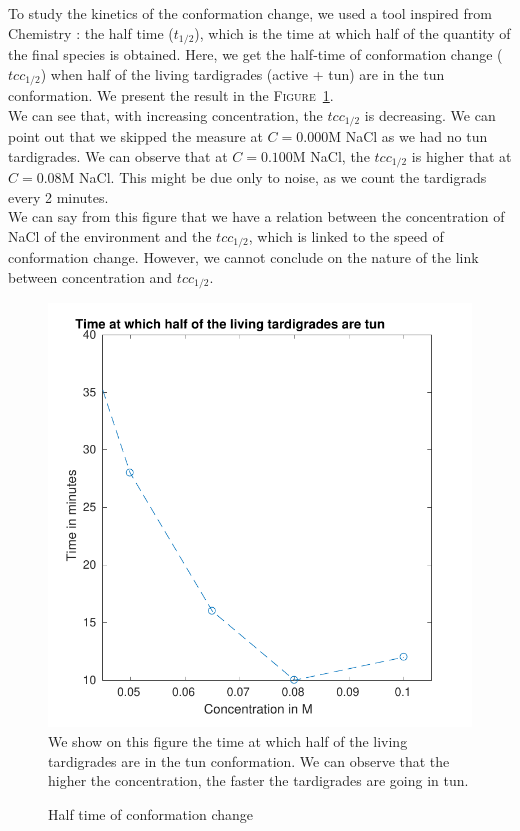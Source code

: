 \documentclass[12pt,a4paper, twocolumn]{article}
\begin{document}
To study the kinetics of the conformation change, we used a tool inspired from Chemistry : the half time ($t_{1/2}$), which is the time at which half of the quantity of the final species is obtained. Here, we get the half-time of conformation change ($tcc_{1/2}$) when half of the living tardigrades (active + tun) are in the tun conformation. We present the result in the \textsc{Figure}~\ref{tcc}.\\
We can see that, with increasing concentration, the $tcc_{1/2}$ is decreasing. We can point out that we skipped the measure at $C=0.000$M NaCl as we had no tun tardigrades. We can observe that at $C=0.100$M NaCl, the $tcc_{1/2}$ is higher that at $C=0.08$M NaCl. This might be due only to noise, as we count the tardigrads every 2 minutes.\\
We can say from this figure that we have a relation between the concentration of NaCl of the environment and the $tcc_{1/2}$, which is linked to the speed of conformation change. However, we cannot conclude on the nature of the link between concentration and $tcc_{1/2}$.\\

\begin{figure}
\includegraphics[width=\linewidth]{tcc.pdf}
\label{tcc}
We show on this figure the time at which half of the living tardigrades are in the tun conformation. We can observe that the higher the concentration, the faster the tardigrades are going in tun.
\caption{Half time of conformation change}
\end{figure}
\end{document}
